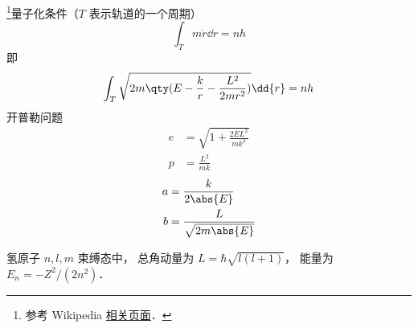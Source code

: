 
\begin{issues}
\issueDraft
\end{issues}

\footnote{参考 Wikipedia \href{https://en.wikipedia.org/wiki/Old_quantum_theory}{相关页面}．}量子化条件（$T$ 表示轨道的一个周期）
\begin{equation}
\int_T m\dot r \dd{r} = nh
\end{equation}
即
\begin{equation}
\int_T \sqrt{2m\qty(E - \frac{k}{r} - \frac{L^2}{2mr^2})} \dd{r} = nh
\end{equation}
开普勒问题
\begin{align}
e &= \sqrt{1 + \frac{2EL^2}{mk^2}}\\
p &= \frac{L^2}{mk}
\end{align}
\begin{align}
a &= \frac{k}{2\abs{E}}\\
b &= \frac{L}{\sqrt{2m\abs{E}}}
\end{align}

氢原子 $n,l,m$ 束缚态中， 总角动量为 $L = \hbar\sqrt{l(l+1)}$， 能量为 $E_n = -Z^2/(2n^2)$．
